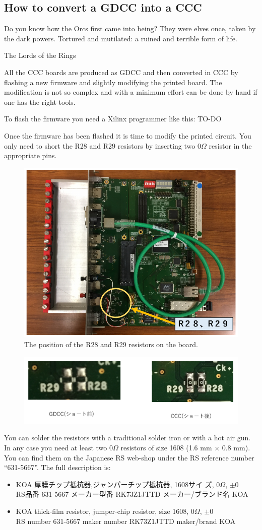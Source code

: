 \subsection{How to convert a GDCC into a CCC}
\epigraph{Do you know how the Orcs first came into being? They were elves once,
  taken by the dark powers. Tortured and mutilated: a ruined and terrible form
  of life.}{The Lords of the Rings} All the CCC boards are produced as GDCC and
then converted in CCC by flashing a new firmware and slightly modifying the
printed board. The modification is not so complex and with a minimum effort can
be done by hand if one has the right tools.

To flash the firmware you need a Xilinx programmer like this: TO-DO

Once the firmware has been flashed it is time to modify the printed circuit. You
only need to short the R28 and R29 resistors by inserting two $0\Omega$ resistor
in the appropriate pins.
\begin{figure}[ht]
  \centering \includegraphics[width=0.5\linewidth,frame]{GDCC-CCC1}
  \caption{The position of the R28 and R29 resistors on the board.}
\end{figure}
\begin{figure}[ht]
  \centering \includegraphics[width=0.8\linewidth]{GDCC-CCC2}
\end{figure}
You can solder the resistors with a traditional solder iron or with a hot air
gun. In any case you need at least two $0\Omega$ resistors of size 1608 (1.6 mm
× 0.8 mm). You can find them on the Japanese RS web-shop under the RS reference
number ``631-5667''. The full description is:
\begin{itemize}
\item \begin{CJK}{UTF8}{min}KOA 厚膜チップ抵抗器,ジャンパーチップ抵抗器, 1608サイ
    ズ, $0\Omega$, $\pm
    0$ \\
    RS品番 631-5667 メーカー型番 RK73Z1JTTD メーカー/ブランド名 KOA\end{CJK}
\item KOA thick-film resistor, jumper-chip resistor, size 1608, $0\Omega$, $\pm
  0$ \\
  RS number 631-5667 maker number RK73Z1JTTD maker/brand KOA
\end{itemize}
